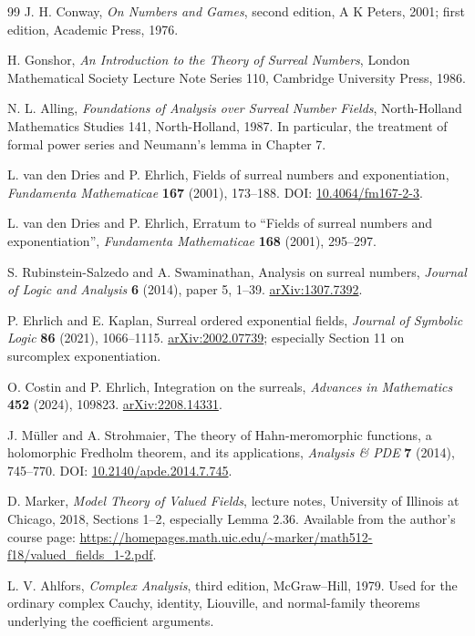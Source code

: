 \documentclass[11pt,oneside]{article}
\theoremstyle{definition}\newtheorem{definition}[theorem]{Definition}
\begin{document}
\begin{thebibliography}{99}
J. H. Conway, \emph{On Numbers and Games}, second edition, A K Peters, 2001; first edition, Academic Press, 1976.

H. Gonshor, \emph{An Introduction to the Theory of Surreal Numbers}, London Mathematical Society Lecture Note Series 110, Cambridge University Press, 1986.

N. L. Alling, \emph{Foundations of Analysis over Surreal Number Fields}, North-Holland Mathematics Studies 141, North-Holland, 1987. In particular, the treatment of formal power series and Neumann's lemma in Chapter 7.

L. van den Dries and P. Ehrlich, Fields of surreal numbers and exponentiation, \emph{Fundamenta Mathematicae} \textbf{167} (2001), 173--188. DOI: \href{https://doi.org/10.4064/fm167-2-3}{10.4064/fm167-2-3}.

L. van den Dries and P. Ehrlich, Erratum to ``Fields of surreal numbers and exponentiation'', \emph{Fundamenta Mathematicae} \textbf{168} (2001), 295--297.

S. Rubinstein-Salzedo and A. Swaminathan, Analysis on surreal numbers, \emph{Journal of Logic and Analysis} \textbf{6} (2014), paper 5, 1--39. \href{https://arxiv.org/abs/1307.7392}{arXiv:1307.7392}.

P. Ehrlich and E. Kaplan, Surreal ordered exponential fields, \emph{Journal of Symbolic Logic} \textbf{86} (2021), 1066--1115. \href{https://arxiv.org/abs/2002.07739}{arXiv:2002.07739}; especially Section 11 on surcomplex exponentiation.

O. Costin and P. Ehrlich, Integration on the surreals, \emph{Advances in Mathematics} \textbf{452} (2024), 109823. \href{https://arxiv.org/abs/2208.14331}{arXiv:2208.14331}.

J. M\"uller and A. Strohmaier, The theory of Hahn-meromorphic functions, a holomorphic Fredholm theorem, and its applications, \emph{Analysis \& PDE} \textbf{7} (2014), 745--770. DOI: \href{https://doi.org/10.2140/apde.2014.7.745}{10.2140/apde.2014.7.745}.

D. Marker, \emph{Model Theory of Valued Fields}, lecture notes, University of Illinois at Chicago, 2018, Sections 1--2, especially Lemma 2.36. Available from the author's course page:
\url{https://homepages.math.uic.edu/~marker/math512-f18/valued_fields_1-2.pdf}.

L. V. Ahlfors, \emph{Complex Analysis}, third edition, McGraw--Hill, 1979. Used for the ordinary complex Cauchy, identity, Liouville, and normal-family theorems underlying the coefficient arguments.
\end{thebibliography}
\end{document}

